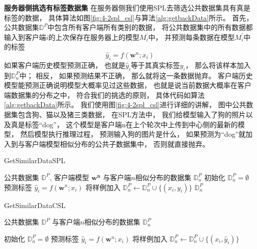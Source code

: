 \textbf{服务器侧挑选有标签数据集}
在服务器侧我们使用SPL去筛选公共数据集具有真是标签的数据，
具体算法如图\ref{fig:4-2spl_csl}与算法\ref{alg:getbackData}所示。
首先，公共数据集$\mathbb{D}^P$中包含所有客户端所有类别的数据，
将公共数据集中的所有数据都输入到客户端$i$的上次保存在服务器上的模型$M_i^{'}$中，
并预测每条数据在模型$M_i^{'}$中的标签
\begin{equation}
    \label{equ:prelabel}
    \hat{y}_i=f(\mathbf{w}^n; x_i)
\end{equation}
如果客户端历史模型预测正确，
也就是$\hat{y}_i$等于其真实标签$y_i$，
那么将该样本加入到$\mathbb{D}^P_n$中；
相反，
如果预测结果不正确，
那么就将这一条数据抛弃。
客户端历史模型能预测正确说明模型大概率见过这些数据，
也就是说当前数据大概率在客户端数据集的分布之中，
符合我们的挑选的原则，
具体代码如算法\ref{alg:getbackData}所示。
我们使用图\ref{fig:4-2spl_csl}进行详细的讲解，
图中公共数据集包含狗、猫以及猪三类数据，
在SPL方法中，
我们给模型输入了狗的照片以及真是标签“dog”，
这个模型是客户端n在上个轮次中上传到中心侧的最新的模型，
然后模型执行推理过程，
预测输入狗的图片是什么，
如果预测为“dog”就加入到与客户端模型相似分布的公共子数据集中，
否则就直接抛弃。
\begin{algorithm}[thbp]
    \caption{GetSimilarDataSPL}\label{alg:getbackData}
    \begin{algorithmic}[1]
    \Require 公共数据集 $\mathbb{D}^P$, 客户端模型 $\mathbf{w^n}$
    \Ensure 与客户端$n$相似分布的数据集 $\mathbb{D}^P_n$ 
        \State 初始化 $\mathbb{D}^P_n=\emptyset$
            \State 预测标签 $\hat{y}_i=f(\mathbf{w}^n; x_i)$
               \State 将样例加入 $\mathbb{D}^P_n \gets \mathbb{D}^P_n \cup \{(x_i,y_i)\}$
            \EndIf
        \EndFor
        \State \Return $\mathbb{D}^P_n$
    \EndProcedure
    \end{algorithmic}
\end{algorithm}

\begin{algorithm}[thbp]
    \caption{GetSimilarDataCSL}\label{alg:getbackwardData1}
    \begin{algorithmic}[1]
    \Require 公共数据集 $\mathbb{D}^P$
    \Ensure 与客户端$n$相似分布的数据集 $\mathbb{D}^P_n$ 
    
        \State 初始化 $\mathbb{D}^P_n=\emptyset$
            \State 预测标签 $\hat{y}_i=f(\mathbf{w}^n; x_i)$
            \State 将样例加入 $\mathbb{D}^P_n \gets \mathbb{D}^P_n \cup \{(x_i,\hat{y}_i)\}$
        \EndFor
    \EndProcedure
    \end{algorithmic}
\end{algorithm}

